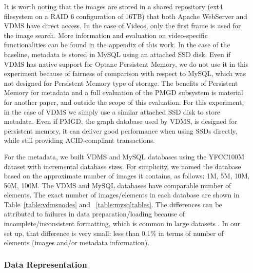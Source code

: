 It is worth noting that the images are stored in a shared repository
(ext4 filesystem on a RAID 6 configuration of 16TB) that both
Apache WebServer and VDMS have direct access.
In the case of Videos, only the first frame is used for the image search.
More information and evaluation on video-specific functionalities can be found
in the appendix of this work.
In the case of the baseline, metadata is
stored in MySQL using an attached SSD disk.
Even if VDMS has native support for Optane Persistent Memory,
we do not use it in this experiment because of fairness of
comparison with respect to MySQL, which was not designed for
Persistent Memory type of storage.
The benefits of Persistent Memory for metadata and a full evaluation of
the PMGD subsystem is material for another paper,
and outside the scope of this evaluation.
For this experiment, in the case of VDMS we simply use a similar
attached SSD disk to store metadata.
Even if PMGD, the graph database used by VDMS, is designed for persistent memory,
it can deliver good performance when using SSDs directly, while still
providing ACID-compliant transactions.

For the metadata, we built VDMS and MySQL databases
using the YFCC100M dataset with incremental database sizes.
For simplicity, we named the database based on the approximate number of images
it contains, as follows: 1M, 5M, 10M, 50M, 100M.
The VDMS and MySQL databases have comparable number of elements.
The exact number of images/elements in each database are shown in
Table~\ref{table:vdmsnodes} and ~\ref{table:mysqltables}.
The differences can be attributed to failures in data
preparation/loading because of incomplete/inconsistent formatting,
which is common in large datasets \cite{failures}.
In our set up, that difference is very small:
less than 0.1\% in terms of number of elements (images and/or metadata information).

\subsubsection{Data Representation}


